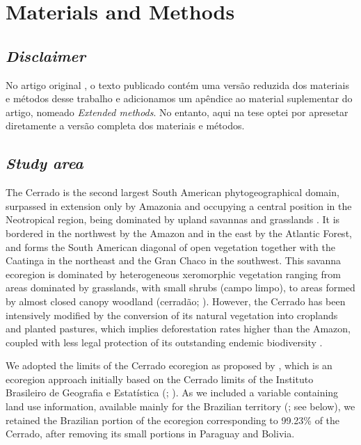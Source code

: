 \documentclass[12pt,openright,oneside,a4paper,english]{abntex2}
\begin{document}
\section{Materials and Methods}
\subsection*{\textit{Disclaimer}}

No artigo original \citep{VieiraAlencar2023}, o texto publicado contém uma versão reduzida dos materiais e métodos desse trabalho e adicionamos um apêndice ao material suplementar do artigo, nomeado \textit{Extended methods}. No entanto, aqui na tese optei por apresetar diretamente a versão completa dos materiais e métodos.

\subsection{\textit{Study area}}

The Cerrado is the second largest South American phytogeographical domain, surpassed in extension only by Amazonia and occupying a central position in the Neotropical region, being dominated by upland savannas and grasslands \citep{Absaber1998}. It is bordered in the northwest by the Amazon and in the east by the Atlantic Forest, and forms the South American diagonal of open vegetation together with the Caatinga in the northeast and the Gran Chaco in the southwest. This savanna ecoregion is dominated by heterogeneous xeromorphic vegetation ranging from areas dominated by grasslands, with small shrubs (campo limpo), to areas formed by almost closed canopy woodland (cerradão; \citealp{Eiten1972, Ratter1997}). However, the Cerrado has been intensively modified by the conversion of its natural vegetation into croplands and planted pastures, which implies deforestation rates higher than the Amazon, coupled with less legal protection of its outstanding endemic biodiversity \citep{Strassburg2017}.

We adopted the limits of the Cerrado ecoregion as proposed by \citet{Dinerstein2017}, which is an ecoregion approach initially based on the Cerrado limits of the Instituto Brasileiro de Geografia e Estatística (\citealp{IBGE1993}; \citealp[see][]{Olson2001}). As we included a variable containing land use information, available mainly for the Brazilian territory (\citealp{MapBiomas2022}; see below), we retained the Brazilian portion of the ecoregion corresponding to 99.23\% of the Cerrado, after removing its small portions in Paraguay and Bolivia.
\end{document}
